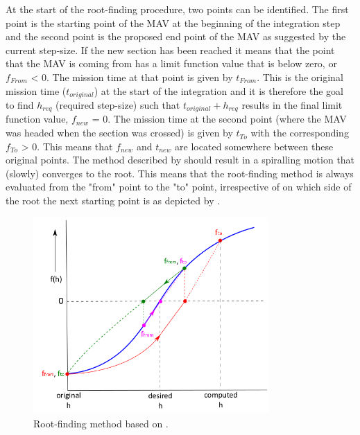 \noindent
At the start of the root-finding procedure, two points can be identified. The first point is the starting point of the \ac{MAV} at the beginning of the integration step and the second point is the proposed end point of the \ac{MAV} as suggested by the current step-size. If the new section has been reached it means that the point that the \ac{MAV} is coming from has a limit function value that is below zero, or $f_{From}$ < 0. The mission time at that point is given by $t_{From}$. This is the original mission time ($t_{original}$) at the start of the integration and it is therefore the goal to find $h_{req}$ (required step-size) such that $t_{original}+h_{req}$ results in the final limit function value, $f_{new}$ = 0. The mission time at the second point (where the \ac{MAV} was headed when the section was crossed) is given by $t_{To}$ with the corresponding $f_{To}$ > 0. This means that $f_{new}$ and $t_{new}$ are located somewhere between these original points. The method described by \cite{bergsma2015application} should result in a spiralling motion that (slowly) converges to the root. This means that the root-finding method is always evaluated from the "from" point to the "to" point, irrespective of on which side of the root the next starting point is as depicted by . \\




 \begin{figure}[H]
\centering
\includegraphics[width=0.8\textwidth]{figures/tsi/rootFindingMethod_bergsma2015application.png}
\caption{Root-finding method based on \cite{bergsma2015application}.}
\label{fig:rootFindingMethod_bergsma2015application}
\end{figure}

